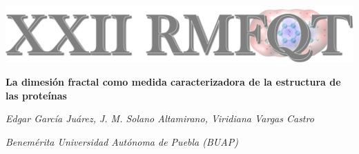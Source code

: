 \documentclass[11pt,a4paper]{letter}
\begin{document}
\begin{center}
\includegraphics{rmfqt-2024}
\end{center}
\vspace{0.5cm}
\begin{center}
{\bfseries\LARGE La dimesión fractal como medida caracterizadora de la estructura de las proteínas \par}
\vspace{0.5cm}
{\itshape\Large Edgar García Juárez, J. M. Solano Altamirano, Viridiana Vargas Castro \par}
{\itshape\Large Benemérita Universidad Autónoma de Puebla (BUAP) \par}
\end{center}
\vspace{0.5cm}

\end{document}
